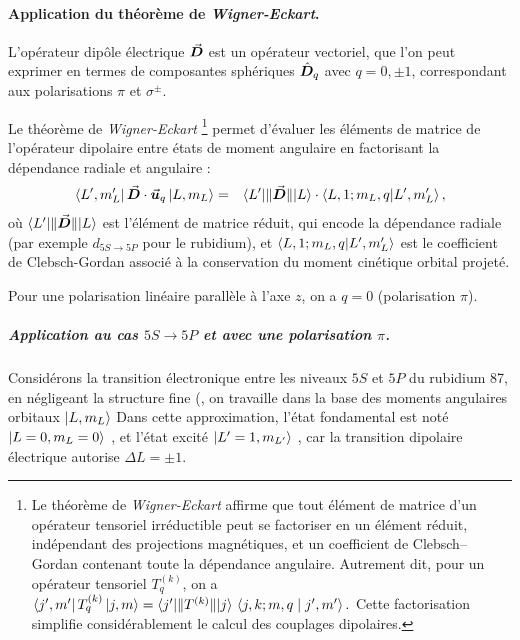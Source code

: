 \paragraph{Application du théorème de \emph{Wigner-Eckart}.}

L’opérateur dipôle électrique $\vec{{\bm{D}}}$ est un opérateur vectoriel, que l’on peut exprimer en termes de composantes sphériques $\hat{\bm{D}}_q$ avec $q = 0 , \pm 1 $, correspondant aux polarisations $\pi$  et $\sigma^\pm$.

\medskip

Le théorème de \emph{Wigner-Eckart}
\footnote{%
Le théorème de \emph{Wigner-Eckart} affirme que tout élément de matrice d’un opérateur tensoriel
irréductible peut se factoriser en un élément réduit, indépendant des projections magnétiques,
et un coefficient de Clebsch--Gordan contenant toute la dépendance angulaire. Autrement dit,
pour un opérateur tensoriel $T^{(k)}_q$, on a
$
\bra{j',m'} T^{(k)}_q \ket{j,m}
= \bra{j'}\!\|T^{(k)}\|\!\ket{j}\,
\braket{j,k; m,q \mid j',m'}.
$
Cette factorisation simplifie considérablement le calcul des couplages dipolaires.}
permet d’évaluer les éléments de matrice de l’opérateur dipolaire entre états de moment angulaire en factorisant la dépendance radiale et angulaire :
\begin{eqnarray}
\bra{L', m_{L}'} \vec{{\bm{D}}} \cdot \vec{{\bm{u}}}_q \ket{L, m_L}
& = & \bra{L'}\!\|\vec{{\bm{D}}}\|\!\ket{L} \cdot \braket{L, 1; m_L, q | L', m_{L}'} , 
\label{eq:WignerEckart}
\end{eqnarray}
où $\bra{L'}\!\|\vec{{\bm{D}}}\|\!\ket{L}$ est l’élément de matrice réduit, qui encode la dépendance radiale (par exemple $d_{\scriptstyle 5S \rightarrow 5P}$ pour le rubidium), et $\braket{L, 1; m_L, q | L', m_{L}'}$ est le coefficient de Clebsch-Gordan associé à la conservation du moment cinétique orbital projeté.

\medskip
Pour une polarisation linéaire parallèle à l’axe $z$, on a $q=0$ (polarisation $\pi$).

\subparagraph{Application au cas $5S \rightarrow 5P$ et avec une polarisation $\pi$.}


Considérons la transition électronique entre les niveaux $5S$ et $5P$ du rubidium 87, en négligeant la structure fine (\ie, on travaille dans la base des moments angulaires orbitaux $\ket{L , m_L  } $
Dans cette approximation, l'état fondamental est noté $\ket{L = 0, m_L = 0}$ , et l’état excité $\ket{L' = 1, m_{L'}}$ , car la transition dipolaire électrique autorise $\Delta L = \pm 1 $.



